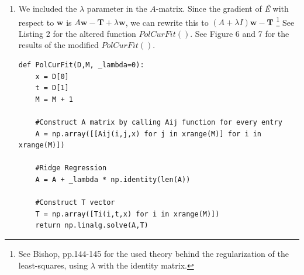 \documentclass[a4paper,11pt]{article}
\theoremstyle{mytheor}
\begin{document}
\begin{enumerate}
	\item We included the $\lambda$ parameter in the $A$-matrix. Since the gradient of \textit{\~{E}} with respect to $\boldsymbol{w}$ is $A\boldsymbol{w}-\boldsymbol{T} + \lambda \boldsymbol{w}$, we can rewrite this to $(A+\lambda I)\boldsymbol{w} - \boldsymbol{T}$ \footnote{See Bishop, pp.144-145 for the used theory behind the regularization of the least-squares, using $\lambda$ with the identity matrix.} See Listing 2 for the altered function $PolCurFit()$. See Figure 6 and 7 for the results of the modified $PolCurFit()$.
		\begin{lstlisting}[label={list:second},caption=Python code for function PolCurFit -- Penalty added.]
def PolCurFit(D,M, _lambda=0):
    x = D[0]
    t = D[1]
    M = M + 1
    
    #Construct A matrix by calling Aij function for every entry
    A = np.array([[Aij(i,j,x) for j in xrange(M)] for i in xrange(M)])
    
    #Ridge Regression
    A = A + _lambda * np.identity(len(A))    
    
    #Construct T vector
    T = np.array([Ti(i,t,x) for i in xrange(M)])
    return np.linalg.solve(A,T)
		\end{lstlisting}


\end{enumerate}
\end{document}
